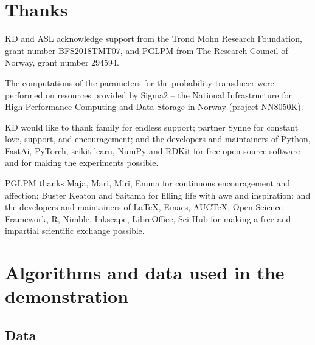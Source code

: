 \documentclass[a4paper,12pt,%
onecolumn,oneside,article,%
british%
]{memoir}
\newenvironment{acknowledgements}{\section*{Thanks}\addcontentsline{toc}{section}{Thanks}}{\par}
\renewcommand*{\|}[1][]{\nonscript\:#1\vert\nonscript\:\mathopen{}}
\begin{document}
\begin{acknowledgements}
  KD and ASL acknowledge support from the Trond Mohn Research Foundation, grant number BFS2018TMT07, and PGLPM from The Research Council of Norway, grant number 294594.

  The computations of the parameters for the probability transducer were performed on resources provided by Sigma2 -- the National Infrastructure for High Performance Computing and Data Storage in Norway (project NN8050K).

  KD would like to thank family for endless support; partner Synne for constant love, support, and encouragement; and the developers and maintainers of Python, FastAi, PyTorch, scikit-learn, NumPy and RDKit for free open source software and for making the experiments possible. 

  PGLPM thanks Maja, Mari, Miri, Emma for continuous encouragement and affection;  Buster Keaton and Saitama for filling life with awe and inspiration; and the developers and maintainers of \LaTeX, Emacs, AUC\TeX, Open Science Framework, R, Nimble, Inkscape, LibreOffice, Sci-Hub for making a free and impartial scientific exchange possible.
\end{acknowledgements}



\clearpage

\renewcommand*{\appendixpagename}{Appendices: mathematical and technical details}
\appendix



\section{Algorithms and data used in the demonstration}
\label{sec:appendix_algorithms} 

\subsection{Data} 
  
\end{document}
